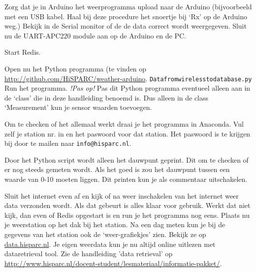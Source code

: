 Zorg dat je in Arduino het weerprogramma upload naar de Arduino
(bijvoorbeeld met een USB kabel. Haal bij deze procedure het snoertje bij `Rx' op de
Arduino weg.) Bekijk in de Serial monitor of de de data correct wordt
weergegeven. Sluit nu de UART-APC220 module aan op de Arduino en de PC.  

Start Redis.

Open nu het Python programma (te vinden op
\url{http://github.com/HiSPARC/weather-arduino}. \verb|Datafromwirelesstodatabase.py|
Run het programma. 
\emph{!Pas op!} Pas dit Python programma eventueel alleen aan in de `class' die in deze
handleiding benoemd is. Dus alleen in de class `Measurement' kun je sensor waarden 
toevoegen. 

Om te checken of het allemaal werkt draai je het programma in Anaconda. Vul zelf 
je \hisparc station nr. in en het paswoord voor dat station. Het paswoord is te krijgen
bij \hisparc door te mailen naar \verb|info@hisparc.nl|. 


Door het Python script wordt alleen het dauwpunt geprint. Dit om te checken
of er nog steeds gemeten wordt. Als het goed is zou het dauwpunt tussen 
een waarde van 0-10 moeten liggen. Dit printen kun je als commentaar uitschakelen.

Sluit het internet even af en kijk of na weer inschakelen van het internet weer
data verzonden wordt. Als dat gebeurt is alles klaar voor gebruik.
Werkt dat niet kijk, dan even of Redis opgestart is en run je het programma
nog eens.
Plaats nu je weerstation op het dak bij het station. Na een dag meten kun je 
bij de gegevens van het station ook de `weer-grafiekjes' zien. Bekijk ze op
\url{data.hisparc.nl}.
Je eigen weerdata kun je nu altijd online uitlezen met dataretrieval tool. Zie de handleiding
'data retrieval' op \url{http://www.hisparc.nl/docent-student/lesmateriaal/informatie-pakket/}.






